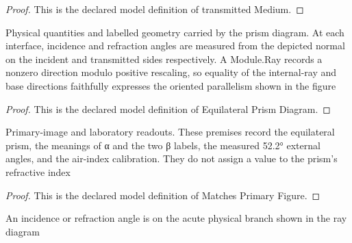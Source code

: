 \begin{proof}
  This is the declared model definition of transmitted Medium.
\end{proof}
\begin{definition}
  \label{def:physics:phyx-mini-0074:phyxminiproblems-problemphyxmini0074-equilateralprismdiagram}
  Physical quantities and labelled geometry carried by the prism diagram. At each interface, incidence and refraction angles are measured from the depicted normal on the incident and transmitted sides respectively. A Module.Ray records a nonzero direction modulo positive rescaling, so equality of the internal-ray and base directions faithfully expresses the oriented parallelism shown in the figure
\end{definition}
\begin{proof}
  This is the declared model definition of Equilateral Prism Diagram.
\end{proof}
\begin{definition}
  \label{def:physics:phyx-mini-0074:phyxminiproblems-problemphyxmini0074-matchesprimaryfigure}
  Primary-image and laboratory readouts. These premises record the equilateral prism, the meanings of α and the two β labels, the measured 52.2° external angles, and the air-index calibration. They do not assign a value to the prism's refractive index
\end{definition}
\begin{proof}
  This is the declared model definition of Matches Primary Figure.
\end{proof}
\begin{definition}
  \label{def:physics:phyx-mini-0074:phyxminiproblems-problemphyxmini0074-isphysicalrayangle}
  An incidence or refraction angle is on the acute physical branch shown in the ray diagram
\end{definition}
